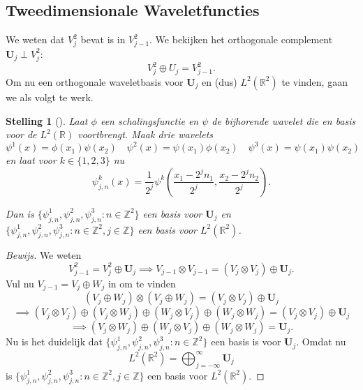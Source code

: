 \documentclass[11pt]{report}
\newcommand{\R}{\mathbb{R}}
\newcommand{\Z}{\mathbb{Z}}
\theoremstyle{plain}
\newtheorem*{stelling}{Stelling}
\theoremstyle{remark}
\begin{document}
\subsection{Tweedimensionale Waveletfuncties}
We weten dat $V_j^2$ bevat is in $V_{j-1}^2$. 
We bekijken het orthogonale complement $\boldsymbol{U}_j \perp V_j^2$:
\[
	V_j^2 \oplus U_j = V_{j-1}^2.
\]
Om nu een orthogonale waveletbasis voor $\boldsymbol{U}_j$ en (dus) $L^2(\R^2)$ te vinden, gaan we als volgt te werk.
\begin{stelling}[{\cite[T7.24]{mallat}}]
Laat $\phi$ een schalingsfunctie en $\psi$ de bijhorende wavelet die en basis voor de $L^2(\R)$ voortbrengt. Maak drie wavelets
\[
	\psi^1(x) = \phi(x_1)\psi(x_2) \quad \psi^2(x) = \psi(x_1) \phi(x_2) \quad \psi^3(x) = \psi(x_1)\psi(x_2)
\]
en laat voor $k \in \{1,2,3\}$ nu
\[
	\psi^k_{j,n}(x) = \frac{1}{2^j} \psi^k\left( \frac{x_1 - 2^j n_1}{2^j}, \frac{x_2 - 2^j n_2}{2^j} \right).
\]

Dan is $\{ \psi^1_{j,n}, \psi^2_{j,n}, \psi^3_{j,n}: n \in \Z^2 \}$ een basis voor $\boldsymbol{U}_j$ 
en $\{ \psi^1_{j,n}, \psi^2_{j,n}, \psi^3_{j,n}: n \in \Z^2, j \in \Z \}$ een basis voor $L^2(\R^2)$.
\end{stelling}
\begin{proof}[Bewijs]
We weten
\[
	V_{j-1}^2 = V_j^2 \oplus \boldsymbol{U}_j \implies V_{j-1} \otimes V_{j-1} = ( V_j \otimes V_j ) \oplus \boldsymbol{U}_j.
\]
Vul nu $V_{j-1} = V_j \oplus W_j$ in om te vinden
\[
	( V_j \oplus W_j ) \otimes (V_j \oplus W_j ) = (V_j \otimes V_j) \oplus \boldsymbol{U}_j %
\]
\[
	\implies (V_j \otimes V_j) \oplus (V_j \otimes W_j) \oplus (W_j \otimes V_j) \oplus (W_j \otimes W_j) = (V_j \otimes V_j) \oplus \boldsymbol{U}_j
\]
\[
	\implies (V_j \otimes W_j) \oplus (W_j \otimes V_j) \oplus (W_j \otimes W_j) = \boldsymbol{U}_j.
\]
Nu is het duidelijk dat $\{ \psi^1_{j,n}, \psi^2_{j,n}, \psi^3_{j,n}: n \in \Z^2 \}$ een basis is voor $\boldsymbol{U}_j$. Omdat nu
\[
	L^2(\R^2) = \bigoplus_{j=-\infty}^\infty \boldsymbol{U}_j
\]
is $\{ \psi^1_{j,n}, \psi^2_{j,n}, \psi^3_{j,n}: n \in \Z^2, j \in \Z \}$ een basis voor $L^2(\R^2)$.
\end{proof}
\end{document}
